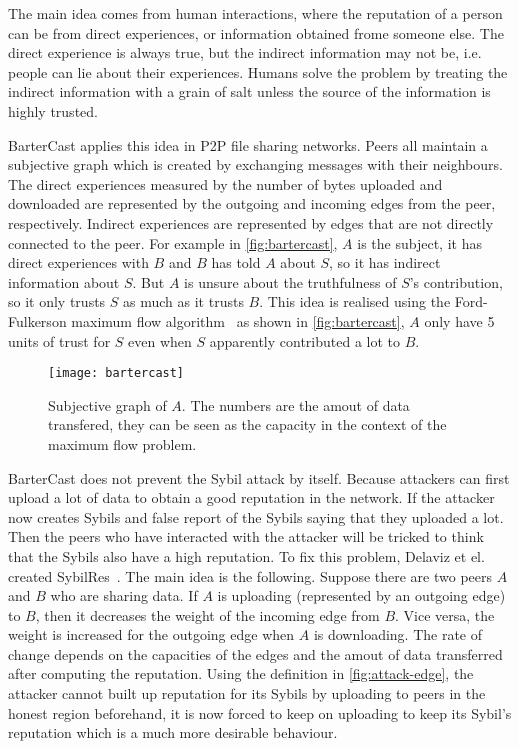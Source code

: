 The main idea comes from human interactions, where the reputation of a person
can be from direct experiences, or information obtained frome someone else. The
direct experience is always true, but the indirect information may not be, i.e.
people can lie about their experiences. Humans solve the problem by treating the
indirect information with a grain of salt unless the source of the information
is highly trusted.

BarterCast applies this idea in P2P file sharing networks. Peers all maintain a
subjective graph which is created by exchanging messages with their neighbours.
The direct experiences measured by the number of bytes uploaded and downloaded
are represented by the outgoing and incoming edges from the peer, respectively.
Indirect experiences are represented by edges that are not directly connected to
the peer. For example in \autoref{fig:bartercast}, $A$ is the subject, it has
direct experiences with $B$ and $B$ has told $A$ about $S$, so it has indirect
information about $S$. But $A$ is unsure about the truthfulness of $S$'s
contribution, so it only trusts $S$ as much as it trusts $B$. This idea is
realised using the Ford-Fulkerson maximum flow
algorithm~\cite{thomas2001introduction} as shown in \autoref{fig:bartercast},
$A$ only have 5 units of trust for $S$ even when $S$ apparently contributed a
lot to $B$.

\begin{figure}
  \centering
  \texttt{[image: bartercast]}
  \caption{Subjective graph of $A$. The numbers are the amout of data transfered,
    they can be seen as the capacity in the context of the maximum flow
    problem.}
  \label{fig:bartercast}
\end{figure}

BarterCast does not prevent the Sybil attack by itself. Because attackers can
first upload a lot of data to obtain a good reputation in the network. If the
attacker now creates Sybils and false report of the Sybils saying that they
uploaded a lot. Then the peers who have interacted with the attacker will be
tricked to think that the Sybils also have a high reputation. To fix this
problem, Delaviz et el. created SybilRes~\cite{delaviz2012sybilres}.
The main idea is the following. Suppose there are two peers $A$ and $B$ who are
sharing data. If $A$ is uploading (represented by an outgoing edge) to $B$, then
it decreases the weight of the incoming edge from $B$. Vice versa, the weight is
increased for the outgoing edge when $A$ is downloading. The rate of change
depends on the capacities of the edges and the amout of data transferred after
computing the reputation. Using the definition in \autoref{fig:attack-edge}, the
attacker cannot built up reputation for its Sybils by uploading to peers in the
honest region beforehand, it is now forced to keep on uploading to keep its
Sybil's reputation which is a much more desirable behaviour.

